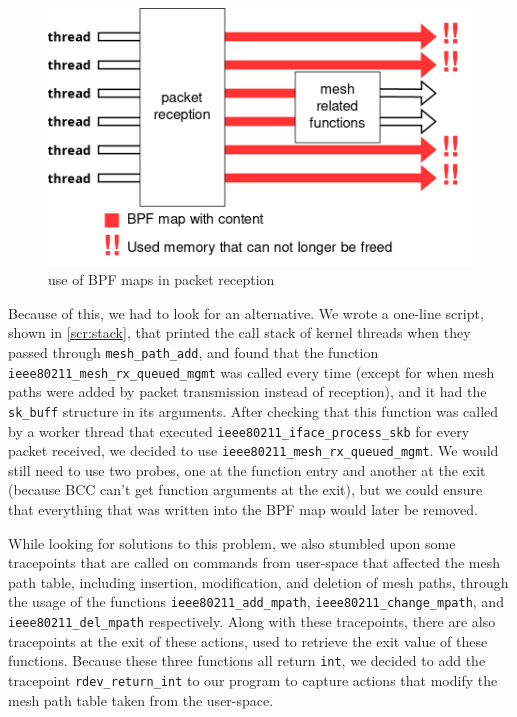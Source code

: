 \begin{figure}[htb]
   \centering
   \includegraphics[scale=.4]{pktin}
   \caption{use of BPF maps in packet reception}\label{fig:pktrx}
\end{figure}

Because of this, we had to look for an alternative. We wrote a one-line script,
shown in \autoref{scr:stack}, that printed the call stack of kernel threads when
they passed through \texttt{mesh\_path\_add}, and found that the function
\texttt{ieee80211\_mesh\_rx\_queued\_mgmt} was called every time (except for
when mesh paths were added by packet transmission instead of reception), and it
had the \texttt{sk\_buff} structure in its arguments. After checking that this
function was called by a worker thread that executed
\texttt{ieee80211\_iface\_process\_skb} for every packet received, we decided to
use \texttt{ieee80211\_mesh\_rx\_queued\_mgmt}. We would still need to use two
probes, one at the function entry and another at the exit (because \ac{BCC}
can't get function arguments at the exit), but we could ensure that everything
that was written into the BPF map would later be removed.

\begin{sloppypar}
While looking for solutions to this problem, we also stumbled upon some
tracepoints that are called on commands from user-space that affected the mesh
path table, including insertion, modification, and deletion of mesh paths,
through the usage of the functions \texttt{ieee80211\_add\_mpath},
\texttt{ieee80211\_change\_mpath}, and \texttt{ieee80211\_del\_mpath}
respectively. Along with these tracepoints, there are also tracepoints at the
exit of these actions, used to retrieve the exit value of these functions.
Because these three functions all return \texttt{int}, we decided to add the
tracepoint \texttt{rdev\_return\_int} to our program to capture actions that
modify the mesh path table taken from the user-space.
\end{sloppypar}

